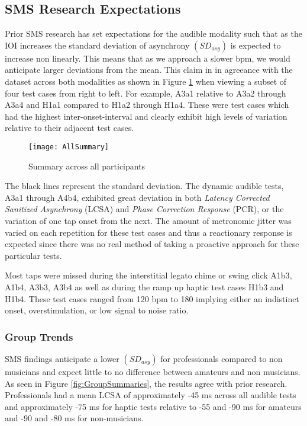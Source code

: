 \subsection{SMS Research Expectations}
Prior SMS research has set expectations for the audible modality such that as the IOI increases the standard deviation of asynchrony $(SD_{asy})$ is expected to increase non linearly. This means that as we approach a slower bpm, we would anticipate larger deviations from the mean. This claim in in agreeance with the dataset across both modalities as shown in Figure \ref{fig:AllSummary} when viewing a subset of four test cases from right to left. For example, A3a1 relative to A3a2 through A3a4 and H1a1 compared to H1a2 through H1a4. These were test cases which had the highest inter-onset-interval and clearly exhibit high levels of variation relative to their adjacent test cases.
\begin{figure}[H]
    \centering
    \texttt{[image: AllSummary]}
    \caption{Summary across all participants}
    \label{fig:AllSummary}
\end{figure}

The black lines represent the standard deviation. The dynamic audible tests, A3a1 through A4b4, exhibited great deviation in both \textit{Latency Corrected Sanitized Asynchrony} (LCSA) and \textit{Phase Correction Response} (PCR), or the variation of one tap onset from the next.  The amount of metronomic jitter was varied on each repetition for these test cases and thus a reactionary response is expected since there was no real method of taking a proactive approach for these particular tests.

Most taps were missed during the interstitial legato chime or swing click A1b3, A1b4, A3b3, A3b4 as well as during the ramp up haptic test cases H1b3 and H1b4. These test cases ranged from 120 bpm to 180 implying either an indistinct onset, overstimulation, or low signal to noise ratio.

\subsubsection{Group Trends}
SMS findings anticipate a lower $(SD_{asy})$ for professionals compared to non musicians and expect little to no difference between amateurs and non musicians. As seen in Figure \ref{fig:GroupSummaries}, the results agree with prior research. Professionals had a mean LCSA of approximately -45 ms across all audible tests and approximately -75 ms for haptic tests relative to -55 and -90 ms for amateurs and -90 and -80 ms for non-musicians.

